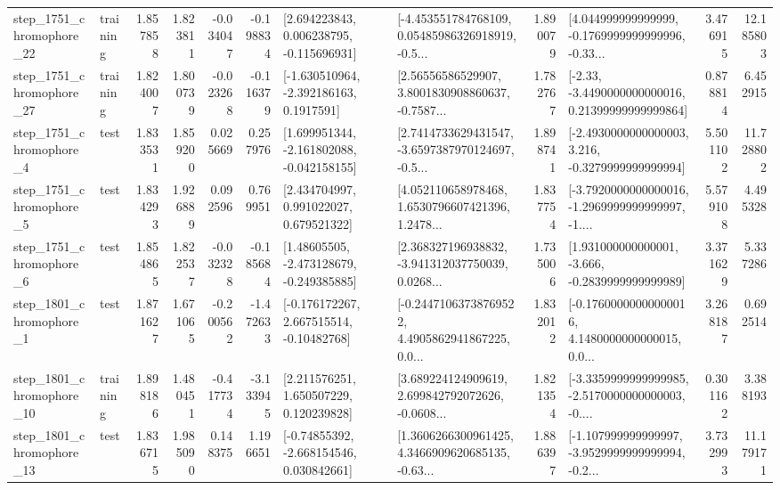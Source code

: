 \begin{tabular}{llrrrrllrlrr}
 step\_1751\_chromophore\_22 &  training &      1.857858 &    1.823811 &     -0.034047 & -0.198834 &    [2.694223843, 0.006238795, -0.115696931] &  [-4.453551784768109, 0.05485986326918919, -0.5... &       1.890079 &  [4.044999999999999, -0.1769999999999996, -0.33... &            3.476915 &         12.185803 \\
 step\_1751\_chromophore\_27 &  training &      1.824007 &    1.800739 &     -0.023268 & -0.116379 &     [-1.630510964, -2.392186163, 0.1917591] &  [2.56556586529907, 3.8001830908860637, -0.7587... &       1.782767 &  [-2.33, -3.4490000000000016, 0.21399999999999864] &            0.878814 &          6.452915 \\
  step\_1751\_chromophore\_4 &      test &      1.833531 &    1.859200 &      0.025669 &  0.257976 &   [1.699951344, -2.161802088, -0.042158155] &  [2.7414733629431547, -3.6597387970124697, -0.5... &       1.898741 &  [-2.4930000000000003, 3.216, -0.3279999999999994] &            5.501102 &         11.728802 \\
  step\_1751\_chromophore\_5 &      test &      1.834293 &    1.926889 &      0.092596 &  0.769951 &     [2.434704997, 0.991022027, 0.679521322] &  [4.052110658978468, 1.6530796607421396, 1.2478... &       1.837754 &  [-3.7920000000000016, -1.2969999999999997, -1.... &            5.579108 &          4.495328 \\
  step\_1751\_chromophore\_6 &      test &      1.854865 &    1.822537 &     -0.032328 & -0.185684 &    [1.48605505, -2.473128679, -0.249385885] &  [2.368327196938832, -3.941312037750039, 0.0268... &       1.735006 &   [1.931000000000001, -3.666, -0.2839999999999989] &            3.371629 &          5.337286 \\
  step\_1801\_chromophore\_1 &      test &      1.871627 &    1.671065 &     -0.200562 & -1.472633 &    [-0.176172267, 2.667515514, -0.10482768] &  [-0.24471063738769522, 4.4905862941867225, 0.0... &       1.832012 &  [-0.17600000000000016, 4.1480000000000015, 0.0... &            3.268187 &          0.692514 \\
 step\_1801\_chromophore\_10 &  training &      1.898186 &    1.480451 &     -0.417734 & -3.133945 &     [2.211576251, 1.650507229, 0.120239828] &  [3.689224124909619, 2.699842792072626, -0.0608... &       1.821354 &  [-3.3359999999999985, -2.5170000000000003, -0.... &            0.301162 &          3.388193 \\
 step\_1801\_chromophore\_13 &      test &      1.836715 &    1.985090 &      0.148375 &  1.196651 &    [-0.74855392, -2.668154546, 0.030842661] &  [1.3606266300961425, 4.3466909620685135, -0.63... &       1.886397 &  [-1.107999999999997, -3.9529999999999994, -0.2... &            3.732993 &         11.179171 \\

\end{tabular}
